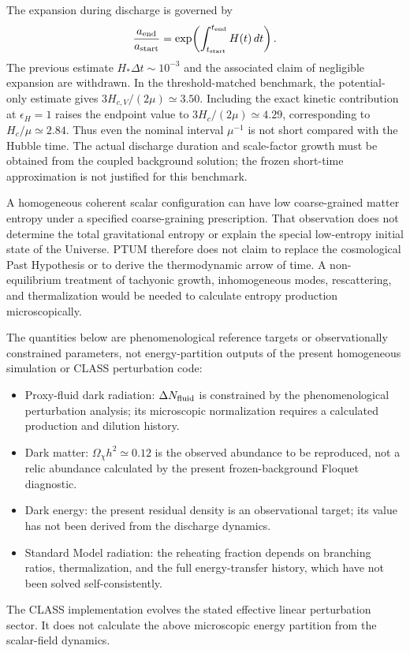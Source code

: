 \documentclass[epj]{svjour}
\begin{document}
The expansion during discharge is governed by
\begin{equation}
\frac{a_{\rm end}}{a_{\rm start}}
=\exp\!\left(\int_{t_{\rm start}}^{t_{\rm end}}H(t)\,dt\right).
\end{equation}
The previous estimate $H_*\Delta t\sim10^{-3}$ and the associated
claim of negligible expansion are withdrawn. In the threshold-matched benchmark, the potential-only
estimate gives $3H_{c,V}/(2\mu)\simeq3.50$. Including the exact
kinetic contribution at $\epsilon_H=1$ raises the endpoint value to
$3H_c/(2\mu)\simeq4.29$, corresponding to $H_c/\mu\simeq2.84$.
Thus even the nominal interval $\mu^{-1}$ is not short compared with
the Hubble time. The actual discharge duration and scale-factor growth
must be obtained from the coupled background solution; the frozen
short-time approximation is not justified for this benchmark.

A homogeneous coherent scalar configuration can have low coarse-grained
matter entropy under a specified coarse-graining prescription. That
observation does not determine the total gravitational entropy or
explain the special low-entropy initial state of the Universe. PTUM
therefore does not claim to replace the cosmological Past Hypothesis or
to derive the thermodynamic arrow of time. A non-equilibrium treatment
of tachyonic growth, inhomogeneous modes, rescattering, and
thermalization would be needed to calculate entropy production
microscopically.

The quantities below are phenomenological reference targets or
observationally constrained parameters, not energy-partition outputs
of the present homogeneous simulation or CLASS perturbation code:
\begin{itemize}
\item Proxy-fluid dark radiation: $\Delta N_{\rm fluid}$ is constrained
by the phenomenological perturbation analysis; its microscopic
normalization requires a calculated production and dilution history.
\item Dark matter: $\Omega_\chi h^2\simeq0.12$ is the observed abundance
to be reproduced, not a relic abundance calculated by the present
frozen-background Floquet diagnostic.
\item Dark energy: the present residual density is an observational
target; its value has not been derived from the discharge dynamics.
\item Standard Model radiation: the reheating fraction depends on
branching ratios, thermalization, and the full energy-transfer history,
which have not been solved self-consistently.
\end{itemize}
The CLASS implementation evolves the stated effective linear
perturbation sector. It does not calculate the above microscopic
energy partition from the scalar-field dynamics.
\end{document}

